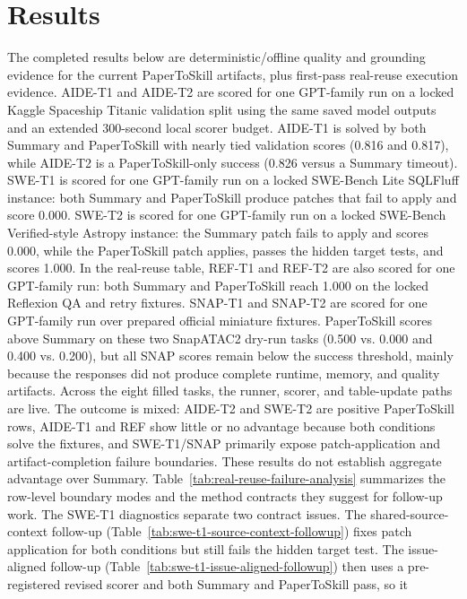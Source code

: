 \section{Results}

The completed results below are deterministic/offline quality and grounding
evidence for the current PaperToSkill artifacts, plus first-pass real-reuse
execution evidence. AIDE-T1 and AIDE-T2 are scored for one GPT-family run on a
locked Kaggle Spaceship Titanic validation split using the same saved model
outputs and an extended 300-second local scorer budget. AIDE-T1 is solved by
both Summary and PaperToSkill with nearly tied validation scores (0.816 and
0.817), while AIDE-T2 is a PaperToSkill-only success (0.826 versus a Summary
timeout). SWE-T1 is scored for one GPT-family run on a locked
SWE-Bench Lite SQLFluff instance: both Summary and PaperToSkill produce patches
that fail to apply and score 0.000. SWE-T2 is scored for one GPT-family run on
a locked SWE-Bench Verified-style Astropy instance: the Summary patch fails to
apply and scores 0.000, while the PaperToSkill patch applies, passes the hidden
target tests, and scores 1.000. In the real-reuse table, REF-T1 and REF-T2 are
also scored for one GPT-family run: both Summary and PaperToSkill reach 1.000
on the locked Reflexion QA and retry fixtures. SNAP-T1 and SNAP-T2 are scored
for one GPT-family run over prepared official miniature fixtures. PaperToSkill
scores above Summary on these two SnapATAC2 dry-run tasks (0.500 vs. 0.000 and
0.400 vs. 0.200), but all SNAP scores remain below the success threshold,
mainly because the responses did not produce complete runtime, memory, and
quality artifacts. Across the eight filled tasks, the runner, scorer, and
table-update paths are live. The outcome is mixed: AIDE-T2 and SWE-T2 are
positive PaperToSkill rows, AIDE-T1 and REF show little or no advantage because
both conditions solve the fixtures, and SWE-T1/SNAP primarily expose
patch-application and artifact-completion failure boundaries. These results do
not establish
aggregate advantage over Summary. Table~\ref{tab:real-reuse-failure-analysis}
summarizes the row-level boundary modes and the method contracts they suggest
for follow-up work. The SWE-T1 diagnostics separate two contract issues. The
shared-source-context follow-up
(Table~\ref{tab:swe-t1-source-context-followup}) fixes patch application for
both conditions but still fails the hidden target test. The issue-aligned
follow-up (Table~\ref{tab:swe-t1-issue-aligned-followup}) then uses a
pre-registered revised scorer and both Summary and PaperToSkill pass, so it
